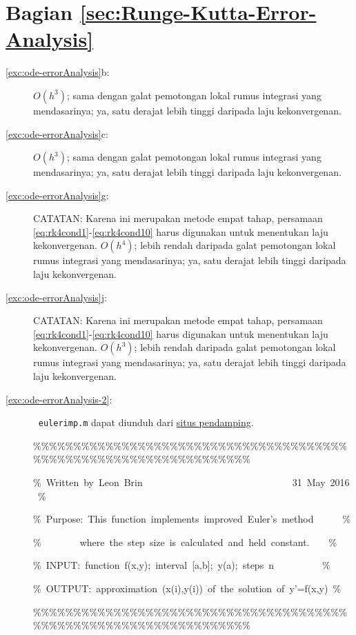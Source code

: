 \section*{Bagian \ref{sec:Runge-Kutta-Error-Analysis}}
\begin{description}
\item [{\ref{exc:ode-errorAnalysis}b:}] $O(h^{3})$; sama dengan galat
pemotongan lokal rumus integrasi yang mendasarinya; ya, satu derajat
lebih tinggi daripada laju kekonvergenan.
\item [{\ref{exc:ode-errorAnalysis}c:}] $O(h^{3})$; sama dengan galat
pemotongan lokal rumus integrasi yang mendasarinya; ya, satu derajat
lebih tinggi daripada laju kekonvergenan.
\item [{\ref{exc:ode-errorAnalysis}g:}] CATATAN: Karena ini merupakan
metode empat tahap, persamaan \ref{eq:rk4cond1}-\ref{eq:rk4cond10}
harus digunakan untuk menentukan laju kekonvergenan. $O(h^{4})$;
lebih rendah daripada galat pemotongan lokal rumus integrasi yang
mendasarinya; ya, satu derajat lebih tinggi daripada laju kekonvergenan.
\item [{\ref{exc:ode-errorAnalysis}j:}] CATATAN: Karena ini merupakan
metode empat tahap, persamaan \ref{eq:rk4cond1}-\ref{eq:rk4cond10}
harus digunakan untuk menentukan laju kekonvergenan. $O(h^{3})$;
lebih rendah daripada galat pemotongan lokal rumus integrasi yang
mendasarinya; ya, satu derajat lebih tinggi daripada laju kekonvergenan.
\item [{\ref{exc:ode-errorAnalysis-2}:}] $\ $
\texttt{eulerimp.m} dapat diunduh dari \href{http://lqbrin.github.io/tea-time-numerical/ancillaries.html}{situs pendamping}.

\begin{lyxcode}
\%\%\%\%\%\%\%\%\%\%\%\%\%\%\%\%\%\%\%\%\%\%\%\%\%\%\%\%\%\%\%\%\%\%\%\%\%\%\%\%\%\%\%\%\%\%\%\%\%\%\%\%\%\%\%\%\%\%\%\%\%\%\%\%\%\%

\%~Written~by~Leon~Brin~~~~~~~~~~~~~~~~~~~~~~~~~~~~~~~31~May~2016~\%

\%~Purpose:~This~function~implements~improved~Euler's~method~~~~~~\%

\%~~~~~~~~where~the~step~size~is~calculated~and~held~constant.~~~~\%

\%~INPUT:~function~f(x,y);~interval~{[}a,b{]};~y(a);~steps~n~~~~~~~~~~\%

\%~OUTPUT:~approximation~(x(i),y(i))~of~the~solution~of~y'=f(x,y)~\%

\%\%\%\%\%\%\%\%\%\%\%\%\%\%\%\%\%\%\%\%\%\%\%\%\%\%\%\%\%\%\%\%\%\%\%\%\%\%\%\%\%\%\%\%\%\%\%\%\%\%\%\%\%\%\%\%\%\%\%\%\%\%\%\%\%\%


\end{lyxcode}
\end{description}
